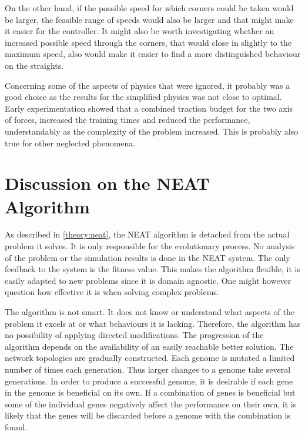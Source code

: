 On the other hand, if the possible speed for which corners could be taken would be larger, the feasible range of speeds would also be larger and that might make it easier for the controller. It might also be worth investigating whether an increased possible speed through the corners, that would close in slightly to the maximum speed, also would make it easier to find a more distinguished behaviour on the straights.

Concerning some of the aspects of physics that were ignored, it probably was a good choice as the results for the simplified physics was not close to optimal. Early experimentation showed that a combined traction budget for the two axis of forces, increased the training times and reduced the performance, understandably as the complexity of the problem increased. This is probably also true for other neglected phenomena.

\section{Discussion on the NEAT Algorithm}
\label{discussion:neat_mechanism}
As described in \ref{theory:neat}, the NEAT algorithm is detached from the actual problem it solves. It is only responsible for the evolutionary process. No analysis of the problem or the simulation results is done in the NEAT system. The only feedback to the system is the fitness value. This makes the algorithm flexible, it is easily adapted to new problems since it is domain agnostic. One might however question how effective it is when solving complex problems.  

The algorithm is not smart. It does not know or understand what aspects of the problem it excels at or what behaviours it is lacking. Therefore, the algorithm has no possibility of applying directed modifications. The progression of the algorithm depends on the availability of an easily reachable better solution. The network topologies are gradually constructed. Each genome is mutated a limited number of times each generation. Thus larger changes to a genome take several generations. In order to produce a successful genome, it is desirable if each gene in the genome is beneficial on its own. If a combination of genes is beneficial but some of the individual genes negatively affect the performance on their own, it is likely that the genes will be discarded before a genome with the combination is found.

